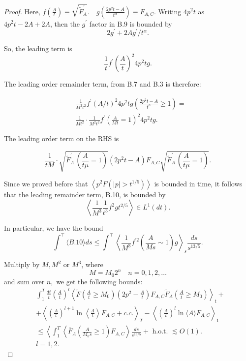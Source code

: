 \documentclass[11pt]{article}
\begin{document}
\begin{proof}
Here, $f\left(\frac{A}{t}\right) \equiv \sqrt{\tilde{F}_{A}^{\prime}} . \quad g\left(\frac{2 p^{2} t-A}{t^{\alpha}}\right) \equiv F_{A, C}$.
Writing $4 p^{2} t$ as $4 p^{2} t-2 A+2 A$, then the $g^{\prime}$ factor in B.9 is bounded by
$$
2 g^{\prime}+2 A g^{\prime} / t^{\alpha} .
$$

So, the leading term is
$$
\frac{1}{t} f^{\prime}\left(\frac{A}{t}\right)^{2} 4 p^{2} t g .
$$

The leading order remainder term, from B.7 and B.3 is therefore:

\begin{align*}
& \frac{1}{M^2 t^{2}} f^{\prime}(A / t)^{2} 4 p^{2} t g\left(\frac{2 p^{2} t-A}{t^{\alpha}} \geqslant 1\right)= \\
& \frac{1}{M t^{2}} \cdot \frac{1}{M^{2} t^{2}} f^{\prime}\left(\frac{A}{M t}=1\right)^{2} 4 p^{2} t g . \tag{B. 10}
\end{align*}


The leading order term on the RHS is

\begin{equation*}
\frac{1}{t M} \cdot \sqrt{\tilde{F}_{A}^{\prime} \,\left(\frac{A}{t \mu}=1\right)}\left(2 p^{2} t-A\right) F_{A, C} \sqrt{\tilde{F}_{A}^{\prime}\,\left(\frac{A}{t \mu}=1\right) }. \tag{B.11}
\end{equation*}


Since we proved before that $\left\langle p^{2} F\left(|p|>t^{1 / 5}\right)\right\rangle$ is bounded in time, it follows that the leading remainder term, B.10, is bounded by
$$
\left\langle\frac{1}{M^{3}} \frac{1}{t^{3}} f^{2} g t^{2/5}\right\rangle \in L^{1}(d t).
$$

In particular, we have the bound
$$
\int^{\top}\langle B. 10\rangle d s \leqslant \int^{\top}\left\langle\frac{1}{M^{3}} f^{\prime 2}\left(\frac{A}{M s} \sim 1\right) g\right\rangle_s \frac{d s}{s^{13/5}} .
$$

Multiply by $M, M^{2}$ or $M^{3}$, where
$$
M=M_{0} 2^{n} \quad n=0,1,2, \ldots
$$
and sum over $n,$
we get the following bounds:
$$
\begin{aligned}
& \int_{1}^{T} \frac{d t}{t}\left(\frac{A}{t}\right)^{l}\left\langle\tilde{F}\left(\frac{A}{t} \geqslant M_{0}\right)\left(2 p^{2}-\frac{A}{t}\right) F_{A, C} \tilde{F}_{A}\left(\frac{A}{t} \geqslant M_{0}\right)\right\rangle_{t}+ \\
& +\left\langle\left(\frac{A}{t}\right)^{l+1} \ln \left\langle\frac{A}{t}\right\rangle F_{A, C}+c. c.\right\rangle_{T}-\left\langle\left(\frac{A}{t}\right)^{l} \ln \langle A\rangle F_{A, C}\right\rangle_{1} \\
& \leq\left\langle\int_{1}^{T}\left\langle \bar F_{A}\left(\frac{A}{M_{0} s} \geqslant 1\right) F_{A, C}\right\rangle \frac{d s}{s^{13 / 5}}+\text { h.o.t. } \lesssim O(1) .\right. \\
& l=1,2 .
\end{aligned}
$$


\end{proof}
\end{document}
